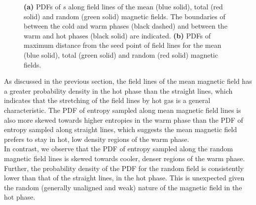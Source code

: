 \documentclass[useAMS,usenatbib]{mn2e}
\begin{document}
\begin{figure}
\caption{\textbf{(a)} PDFs of $s$ along field lines of the mean (blue solid), total (red solid) and random (green solid) magnetic fields. The boundaries of between the cold and warm phases (black dashed) and between the warm and hot phases (black solid) are indicated. \textbf{(b)} PDFs of maximum distance from the seed point of field lines for the mean (blue solid), total (green solid) and random (red solid) magnetic fields.}
\label{fig:tot_pdfs}
\end{figure}
As discussed in the previous section, the field lines of the mean magnetic field has a greater probability density in the hot phase than the straight lines, which indicates that the stretching of the field lines by hot gas is a general characteristic. The PDF of entropy sampled along mean magnetic field lines is also more skewed towards higher entropies in the warm phase than the PDF of entropy sampled along straight lines, which suggests the mean magnetic field prefers to stay in hot, low density regions of the warm phase.\\
In contrast, we observe that the PDF of entropy sampled along the random magnetic field lines is skewed towards cooler, denser regions of the warm phase. Further, the probability density of the PDF for the random field is consistently lower than that of the straight lines, in the hot phase. This is unexpected given the random (generally unaligned and weak) nature of the magnetic field in the hot phase. %
\end{document}
